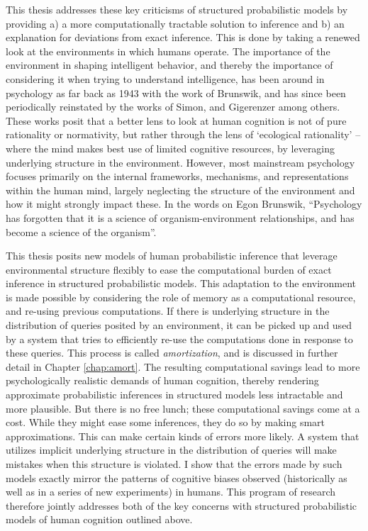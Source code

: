 This thesis addresses these key criticisms of structured probabilistic models by providing a) a more computationally tractable solution to inference and b) an explanation for deviations from exact inference. This is done by taking a renewed look at the environments in which humans operate. The importance of the environment in shaping intelligent behavior, and thereby the importance of considering it when trying to understand intelligence, has been around in psychology as far back as 1943 with the work of Brunswik\citep{brunswik1943organismic}, and has since been periodically reinstated by the works of Simon\citep{simon1956rational}, %
and Gigerenzer \citep{gigerenzer1999simple} among others. These works posit that a better lens to look at human cognition is not of pure rationality or normativity, but rather through the lens of `ecological rationality' -- where the mind makes best use of limited cognitive resources, by leveraging underlying structure in the environment. However, most mainstream psychology focuses primarily on the internal frameworks, mechanisms, and representations within the human mind, largely neglecting the structure of the environment and how it might strongly impact these. In the words on Egon Brunswik, ``Psychology has forgotten that it is a science of organism-environment relationships, and has become a science of the organism''.  

This thesis posits new models of human probabilistic inference that leverage environmental structure flexibly to ease the computational burden of exact inference in structured probabilistic models. This adaptation to the environment is made possible by considering the role of memory as a computational resource, and re-using previous computations. If there is underlying structure in the distribution of queries posited by an environment, it can be picked up and used by a system that tries to efficiently re-use the computations done in response to these queries. This process is called \textit{amortization}, and is discussed in further detail in Chapter \ref{chap:amort}. %
The resulting computational savings lead to more psychologically realistic demands of human cognition, thereby rendering approximate probabilistic inferences in structured models less intractable and more plausible. But there is no free lunch; these computational savings come at a cost. While they might ease some inferences, they do so by making smart approximations. This can make certain kinds of errors more likely. A system that utilizes implicit underlying structure in the distribution of queries will make mistakes when this structure is violated. I show that the errors made by such models exactly mirror the patterns of cognitive biases observed (historically as well as in a series of new experiments) in humans. This program of research therefore jointly addresses both of the key concerns with structured probabilistic models of human cognition outlined above.

